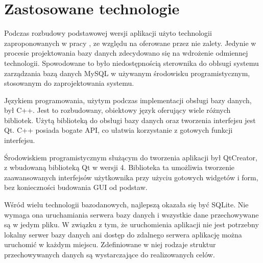 \section{Zastosowane technologie}
\label{sec:implementacja}

Podczas rozbudowy podstawowej wersji aplikacji użyto technologii zaproponowanych w pracy \cite{Gl11}, ze względu na oferowane przez nie zalety. Jedynie w procesie projektowania bazy danych zdecydowano się na wdrożenie odmiennej technologii. Spowodowane to było niedostępnością sterownika do obłsugi systemu zarządzania bazą danych MySQL w używanym środowisku programistycznym, stosowanym do zaprojektowania systemu.

Językiem programowania, użytym podczas implementacji obsługi bazy danych, był C++. Jest to rozbudowany, obiektowy język oferujący wiele różnych bibliotek. Użytą biblioteką do obsługi bazy danych oraz tworzenia interfejsu jest Qt. C++ posiada bogate API, co ułatwia korzystanie z gotowych funkcji interfejsu.

Środowiskiem programistycznym służącym do tworzenia aplikacji był QtCreator, z wbudowaną biblioteką Qt w wersji 4. Biblioteka ta umożliwia tworzenie zaawansowanych interfejsów użytkownika przy użyciu gotowych widgetów i form, bez konieczności budowania GUI od podstaw.

Wśród wielu technologii bazodanowych, najlepszą okazała się być SQLite. Nie wymaga ona uruchamiania serwera bazy danych i wszystkie dane przechowywane są w jedym pliku. W związku z tym, że uruchomienia aplikacji nie jest potrzebny lokalny serwer bazy danych ani dostęp do zdalnego serwera aplikację można uruchomić w każdym miejscu. Zdefiniowane w niej rodzaje struktur przechowywanych danych są wystarczające do realizowanych celów.
